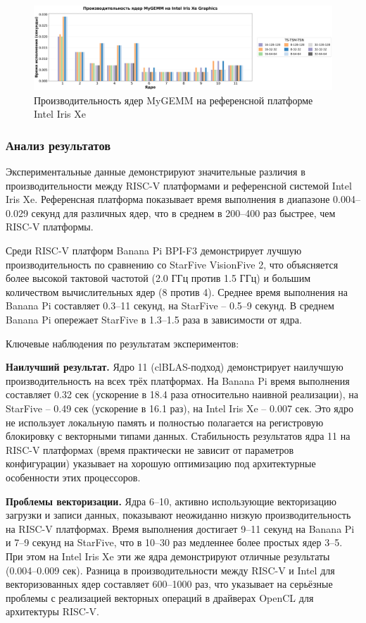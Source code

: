 \begin{figure}[H]
\centering
\includegraphics[width=1\textwidth]{figures/intel_xe.png}
\caption{Производительность ядер MyGEMM на референсной платформе Intel Iris Xe}
\label{fig:perf_intelxe}
\end{figure}

\subsubsection{Анализ результатов}

Экспериментальные данные демонстрируют значительные различия в производительности между RISC-V платформами и референсной системой Intel Iris Xe. Референсная платформа показывает время выполнения в диапазоне 0.004--0.029 секунд для различных ядер, что в среднем в 200--400 раз быстрее, чем RISC-V платформы.

Среди RISC-V платформ Banana Pi BPI-F3 демонстрирует лучшую производительность по сравнению со StarFive VisionFive 2, что объясняется более высокой тактовой частотой (2.0 ГГц против 1.5 ГГц) и большим количеством вычислительных ядер (8 против 4). Среднее время выполнения на Banana Pi составляет 0.3--11 секунд, на StarFive -- 0.5--9 секунд. В среднем Banana Pi опережает StarFive в 1.3--1.5 раза в зависимости от ядра.

Ключевые наблюдения по результатам экспериментов:

\textbf{Наилучший результат.} Ядро 11 (clBLAS-подход) демонстрирует наилучшую производительность на всех трёх платформах. На Banana Pi время выполнения составляет 0.32 сек (ускорение в 18.4 раза относительно наивной реализации), на StarFive -- 0.49 сек (ускорение в 16.1 раз), на Intel Iris Xe -- 0.007 сек. Это ядро не использует локальную память и полностью полагается на регистровую блокировку с векторными типами данных. Стабильность результатов ядра 11 на RISC-V платформах (время практически не зависит от параметров конфигурации) указывает на хорошую оптимизацию под архитектурные особенности этих процессоров.

\textbf{Проблемы векторизации.} Ядра 6--10, активно использующие векторизацию загрузки и записи данных, показывают неожиданно низкую производительность на RISC-V платформах. Время выполнения достигает 9--11 секунд на Banana Pi и 7--9 секунд на StarFive, что в 10--30 раз медленнее более простых ядер 3--5. При этом на Intel Iris Xe эти же ядра демонстрируют отличные результаты (0.004--0.009 сек). Разница в производительности между RISC-V и Intel для векторизованных ядер составляет 600--1000 раз, что указывает на серьёзные проблемы с реализацией векторных операций в драйверах OpenCL для архитектуры RISC-V.

